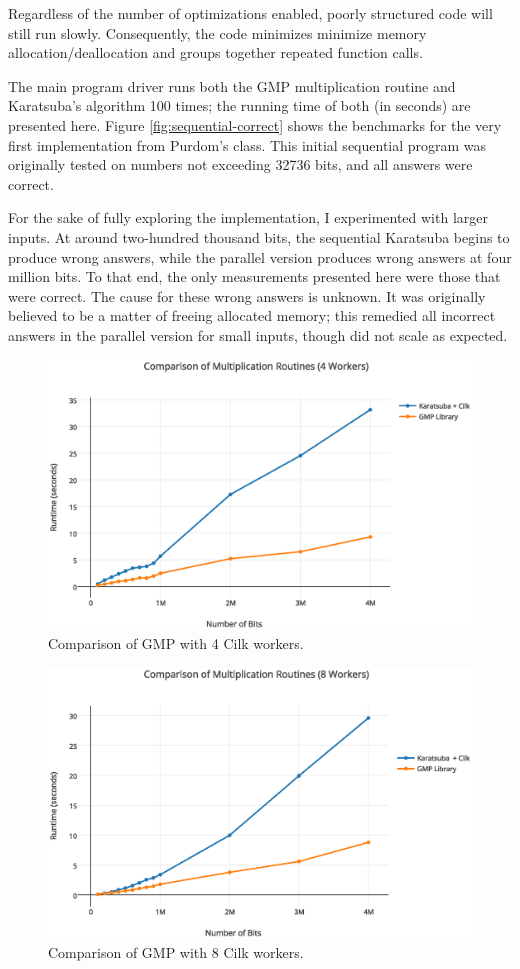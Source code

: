 \documentclass[8pt, twocolumn]{article}
\begin{document}
Regardless of the number of optimizations enabled, poorly structured code will
still run slowly. Consequently, the code minimizes minimize memory
allocation/deallocation and groups together repeated function calls.

The main program driver runs both the GMP multiplication routine and Karatsuba's
algorithm 100 times; the running time of both (in seconds) are presented here.
Figure \ref{fig:sequential-correct} shows the benchmarks for the very first
implementation from Purdom's class. This initial sequential program was
originally tested on numbers not exceeding 32736 bits, and all answers were
correct.

For the sake of fully exploring the implementation, I experimented with larger inputs.
 At around two-hundred thousand bits, the sequential Karatsuba
begins to produce wrong answers, while the parallel version produces wrong
answers at four million bits.  To that end, the only measurements presented here
were those that were correct.  The cause for these wrong answers is unknown.  It
was originally believed to be a matter of freeing allocated memory; this
remedied all incorrect answers in the parallel version for small inputs,
though did not scale as expected. \newline
\begin{figure}[t]
    \includegraphics[scale=0.4]{4-workers}
    \caption{Comparison of GMP with 4 Cilk workers.}
    \label{fig:4-workers}
\end{figure}
\begin{figure}[t]
    \includegraphics[scale=0.4]{8-workers}
    \caption{Comparison of GMP with 8 Cilk workers.}
    \label{fig:8-workers}
\end{figure}
\end{document}
